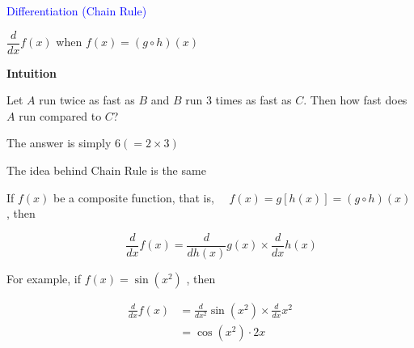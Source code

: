 \documentclass[14pt,fleqn]{extarticle}
\begin{document}

\begin{skill}
\textcolor{blue}{Differentiation (Chain Rule)}

$\dfrac{d}{dx}f(x)$ when $f(x) = \left(g\circ h \right)(x)$ 
\end{skill}

%

\newcard

\textbf{Intuition}

Let $A$ run twice as fast as $B$ and 
$B$ run 3 times as fast as $C$. Then 
how fast does $A$ run compared to $C$?  \newline 

The answer is simply $6 (= 2\times 3)$\newline 

The idea behind Chain Rule is the same \newline 

If $f(x)$ be a composite function, that is, 
$\quad f(x) = g\left[ h(x) \right] = (g\circ h)(x)$, then 

\[ \qquad \frac{d}{dx} f(x) = \frac{d}{d h(x)}g(x)\times \frac{d}{dx} h(x) \]

For example, if $f(x) = \sin \left( x^2\right)$ , then 

\begin{align}
	\frac{d}{dx} f(x) &= \frac{d}{d x^2} \sin \left(x^2 \right)\times \frac{d}{dx} x^2  \\
	&= \cos \left(x^2 \right)\cdot 2x 
\end{align}
%
\end{document}
